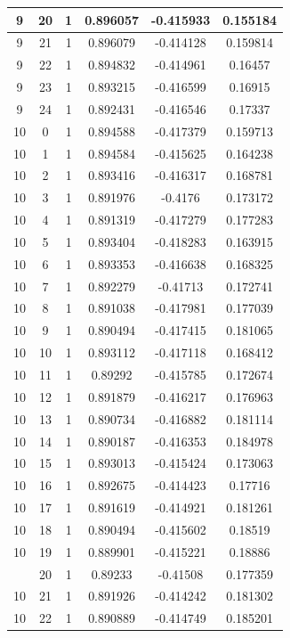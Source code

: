 \documentclass[12pt,a4paper]{article}
\numberwithin{equation}{section}
\numberwithin{figure}{section}
\numberwithin{table}{section}
\begin{document}
\begin{longtable}{|c|c|c|c|c|c|}
9 & 20 & 1 & 0.896057 & -0.415933 & 0.155184 \\ \hline
9 & 21 & 1 & 0.896079 & -0.414128 & 0.159814 \\ \hline
9 & 22 & 1 & 0.894832 & -0.414961 & 0.16457 \\ \hline
9 & 23 & 1 & 0.893215 & -0.416599 & 0.16915 \\ \hline
9 & 24 & 1 & 0.892431 & -0.416546 & 0.17337 \\ \hline
10 & 0 & 1 & 0.894588 & -0.417379 & 0.159713 \\ \hline
10 & 1 & 1 & 0.894584 & -0.415625 & 0.164238 \\ \hline
10 & 2 & 1 & 0.893416 & -0.416317 & 0.168781 \\ \hline
10 & 3 & 1 & 0.891976 & -0.4176 & 0.173172 \\ \hline
10 & 4 & 1 & 0.891319 & -0.417279 & 0.177283 \\ \hline
10 & 5 & 1 & 0.893404 & -0.418283 & 0.163915 \\ \hline
10 & 6 & 1 & 0.893353 & -0.416638 & 0.168325 \\ \hline
10 & 7 & 1 & 0.892279 & -0.41713 & 0.172741 \\ \hline
10 & 8 & 1 & 0.891038 & -0.417981 & 0.177039 \\ \hline
10 & 9 & 1 & 0.890494 & -0.417415 & 0.181065 \\ \hline
10 & 10 & 1 & 0.893112 & -0.417118 & 0.168412 \\ \hline
10 & 11 & 1 & 0.89292 & -0.415785 & 0.172674 \\ \hline
10 & 12 & 1 & 0.891879 & -0.416217 & 0.176963 \\ \hline
10 & 13 & 1 & 0.890734 & -0.416882 & 0.181114 \\ \hline
10 & 14 & 1 & 0.890187 & -0.416353 & 0.184978 \\ \hline
10 & 15 & 1 & 0.893013 & -0.415424 & 0.173063 \\ \hline
10 & 16 & 1 & 0.892675 & -0.414423 & 0.17716 \\ \hline
10 & 17 & 1 & 0.891619 & -0.414921 & 0.181261 \\ \hline
10 & 18 & 1 & 0.890494 & -0.415602 & 0.18519 \\ \hline
10 & 19 & 1 & 0.889901 & -0.415221 & 0.18886 \\ \hline
\pagebreak
10 & 20 & 1 & 0.89233 & -0.41508 & 0.177359 \\ \hline
10 & 21 & 1 & 0.891926 & -0.414242 & 0.181302 \\ \hline
10 & 22 & 1 & 0.890889 & -0.414749 & 0.185201 \\ \hline

\end{longtable}
\end{document}
